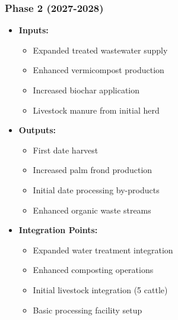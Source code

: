 \subsubsection{Phase 2 (2027-2028)}
\begin{itemize}
    \item \textbf{Inputs:}
    \begin{itemize}
        \item Expanded treated wastewater supply
        \item Enhanced vermicompost production
        \item Increased biochar application
        \item Livestock manure from initial herd
    \end{itemize}
    \item \textbf{Outputs:}
    \begin{itemize}
        \item First date harvest
        \item Increased palm frond production
        \item Initial date processing by-products
        \item Enhanced organic waste streams
    \end{itemize}
    \item \textbf{Integration Points:}
    \begin{itemize}
        \item Expanded water treatment integration
        \item Enhanced composting operations
        \item Initial livestock integration (5 cattle)
        \item Basic processing facility setup
    \end{itemize}
\end{itemize}

